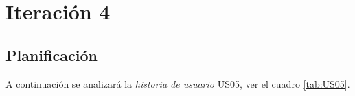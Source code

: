 \section{Iteración 4}
\label{sec:iteracion_4}

%
%
%
%
%

\subsection{Planificación}

%



A continuación se analizará la \emph{historia de usuario} US05, ver el cuadro \ref{tab:US05}.

